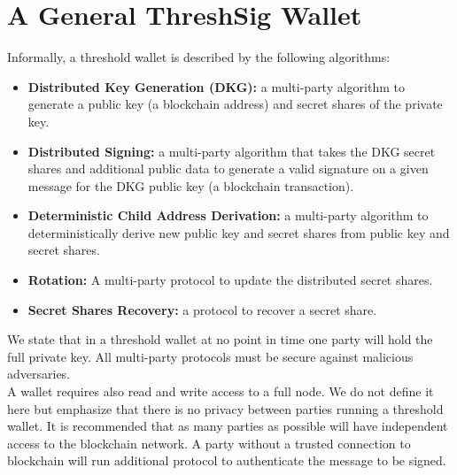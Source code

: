 \documentclass[runningheads]{llncs}
\begin{document}
\section{A General ThreshSig Wallet} 
Informally, a threshold wallet is described by the following algorithms: 
\begin{itemize}
    \item \textbf{Distributed Key Generation (DKG):} a multi-party algorithm to generate a public key (a blockchain address) and secret shares of the private key. 
    \item \textbf{Distributed Signing:} a multi-party algorithm that takes the DKG secret shares and additional public data to generate a valid signature on a given message for the DKG public key (a blockchain transaction).
    \item \textbf{Deterministic Child Address Derivation:} a multi-party algorithm to deterministically derive new public key and secret shares from public key and secret shares. 
    \item \textbf{Rotation:} A multi-party protocol to update the distributed secret shares.
    \item \textbf{Secret Shares Recovery:} a protocol to recover a secret share. 
\end{itemize}
We state that in a threshold wallet at no point in time one party will hold the full private key. All multi-party protocols must be secure against malicious adversaries. \\
A wallet requires also read and write access to a full node. We do not define it here but emphasize that there is no privacy between parties running a threshold wallet. It is recommended that as many parties as possible will have independent access to the blockchain network. A party without a trusted connection to blockchain will run additional protocol to authenticate the message to be signed.  
\end{document}
